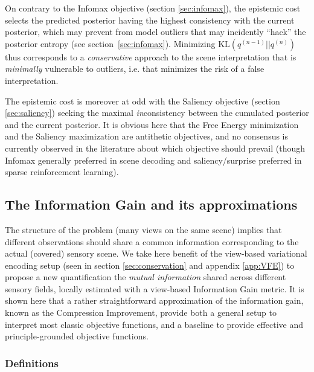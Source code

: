 \documentclass[12pt,twoside,openright]{article}
\begin{document}
On contrary to the Infomax objective (section \ref{sec:infomax}), the {\color{Purple} epistemic cost} selects the predicted posterior having the highest consistency with the current posterior, which may prevent from model outliers that may incidently ``hack'' the posterior entropy (see section~\ref{sec:infomax}).
Minimizing $\text{KL}(q^{(n-1)}||q^{(n)})$ thus corresponds to a \emph{conservative} approach to the scene interpretation
that is \emph{minimally} vulnerable to outliers, i.e. that minimizes the risk of a false interpretation. 

The {\color{Purple} epistemic cost} is moreover at odd with the Saliency objective (section \ref{sec:saliency}) seeking the maximal \emph{in}consistency between the cumulated posterior and the current posterior.
It is obvious here that the Free Energy minimization and the Saliency maximization are antithetic objectives, and no consensus is currently observed in the literature about which objective should prevail (though Infomax generally preferred in scene decoding and saliency/surprise preferred in sparse reinforcement learning).

\subsection{The Information Gain and its approximations}
The structure of the problem (many views on the same scene) implies that {\color{Purple} different observations} should share a common information corresponding to the actual (covered) sensory scene.
We take here benefit of the {\color{Purple} view-based} variational encoding setup
{\color{Purple} (seen in section \ref{sec:conservation} and appendix \ref{app:VFE}) to propose a new quantification the \emph{mutual information} shared across different sensory fields, locally estimated with a view-based Information Gain metric. It is shown here that a rather straightforward approximation of the information gain,
known as the Compression Improvement, provide both a general setup to interpret most classic objective functions, and a baseline to provide effective and  principle-grounded objective functions.}



\subsubsection{Definitions}
\end{document}
